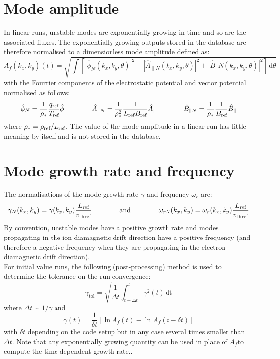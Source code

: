 \documentclass[fleqn]{report}
\begin{document}
\section{Mode amplitude}
In linear runs, unstable modes are exponentially growing in time and so are the associated fluxes. 
The exponentially growing outputs stored in the database are therefore normalised to a dimensionless mode amplitude defined as:
\begin{equation}
 A_f(k_x,k_y)(t) = \sqrt{\int \left[|\hat{\phi}_N(k_x,k_y,\theta)|^2 + |\hat{A}_{\parallel N}(k_x,k_y,\theta)|^2  + |\hat{B}_\parallel N(k_x,k_y,\theta)|^2\right] \,\textrm{d}\theta}
\end{equation}
with the Fourrier components of the electrostatic potential and vector potential normalised as follows:
\begin{equation}
  \hat{\phi}_N = \frac{1}{\rho_*}\frac{q_{\textrm{ref}}}{T_{\textrm{ref}}} \hat{\phi} \qquad \qquad 
  \hat{A}_{\parallel N}=\frac{1}{\rho_*^2}\frac{1}{L_{\textrm{ref}} B_{\textrm{ref}}} \hat{A}_\parallel \qquad \qquad
  \hat{B}_{\parallel N}=\frac{1}{\rho_*}\frac{1}{B_{\textrm{ref}}} \hat{B}_\parallel
\end{equation}
where $\rho_*=\rho_{\textrm{ref}}/L_{\textrm{ref}}$.
The value of the mode amplitude in a linear run has little meaning by itself and is not stored in the database. 

\section{Mode growth rate and frequency}
The normalisations of the mode growth rate $\gamma$ and frequency $\omega_r$ are:
\begin{equation}
 \gamma_N(k_x,k_y) = \gamma(k_x,k_y) \frac{L_{\textrm{ref}}}{v_\textrm{thref}} \qquad \qquad \textrm{and} \qquad \qquad \omega_{rN}(k_x,k_y) = \omega_r(k_x,k_y) \frac{L_{\textrm{ref}}}{v_\textrm{thref}}
\end{equation}
By convention, unstable modes have a positive growth rate and modes propagating in the ion diamagnetic drift direction have a positive frequency (and therefore a negative frequency when they are propagating in the electron diamagnetic drift direction).\\

For initial value runs, the following (post-processing) method is used to determine the tolerance on the run convergence:
$$\gamma_\textrm{tol} = \sqrt{\frac{1}{\Delta t}\int_{t-\Delta t}^t \gamma^2(t)\,\textrm{dt}}$$
where $\Delta t \sim 1/\gamma$ and
$$\gamma(t)=\frac{1}{\delta t}[\ln{A_f(t)}-\ln{A_f(t-\delta t)}]$$
with $\delta t$ depending on the code setup but in any case several times smaller than $\Delta t$. Note that any exponentially growing quantity can be used in place of $A_f$to compute the time dependent growth rate..
\end{document}
